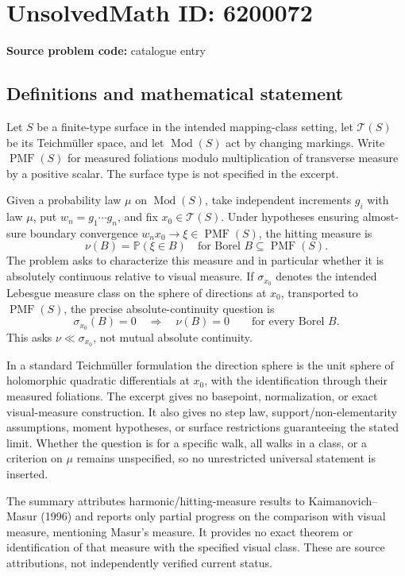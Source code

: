 \documentclass[11pt]{article}
\begin{document}
\section*{UnsolvedMath ID: 6200072}
\textbf{Source problem code:} catalogue entry
\subsection{Definitions and mathematical statement}
Let \(S\) be a finite-type surface in the intended mapping-class setting, let \(\mathcal T(S)\) be its Teichm\"uller space, and let \(\operatorname{Mod}(S)\) act by changing markings. Write \(\operatorname{PMF}(S)\) for measured foliations modulo multiplication of transverse measure by a positive scalar. The surface type is not specified in the excerpt.

Given a probability law \(\mu\) on \(\operatorname{Mod}(S)\), take independent increments \(g_i\) with law \(\mu\), put \(w_n=g_1\cdots g_n\), and fix \(x_0\in\mathcal T(S)\). Under hypotheses ensuring almost-sure boundary convergence \(w_nx_0\to\xi\in\operatorname{PMF}(S)\), the hitting measure is
\[
 \nu(B)=\mathbb P(\xi\in B)
 \quad\text{for Borel }B\subseteq\operatorname{PMF}(S).
\]
The problem asks to characterize this measure and in particular whether it is absolutely continuous relative to visual measure. If \(\sigma_{x_0}\) denotes the intended Lebesgue measure class on the sphere of directions at \(x_0\), transported to \(\operatorname{PMF}(S)\), the precise absolute-continuity question is
\[
 \sigma_{x_0}(B)=0\quad\Longrightarrow\quad\nu(B)=0
 \qquad\text{for every Borel }B.
\]
This asks \(\nu\ll\sigma_{x_0}\), not mutual absolute continuity.

In a standard Teichm\"uller formulation the direction sphere is the unit sphere of holomorphic quadratic differentials at \(x_0\), with the identification through their measured foliations. The excerpt gives no basepoint, normalization, or exact visual-measure construction. It also gives no step law, support/non-elementarity assumptions, moment hypotheses, or surface restrictions guaranteeing the stated limit. Whether the question is for a specific walk, all walks in a class, or a criterion on \(\mu\) remains unspecified, so no unrestricted universal statement is inserted.

The summary attributes harmonic/hitting-measure results to Kaimanovich--Masur (1996) and reports only partial progress on the comparison with visual measure, mentioning Masur's measure. It provides no exact theorem or identification of that measure with the specified visual class. These are source attributions, not independently verified current status.
\end{document}
